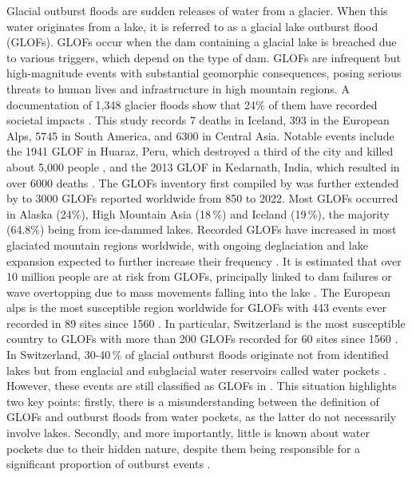 Glacial outburst floods are sudden releases of water from a glacier. When this water originates from a lake, it is referred to as a glacial lake outburst flood (GLOFs). GLOFs occur when the dam containing a glacial lake is breached due to various triggers, which depend on the type of dam. GLOFs are infrequent but high-magnitude events with substantial geomorphic consequences, posing serious threats to human lives and infrastructure in high mountain regions. A documentation of 1,348 glacier floods show that 24\% of them have recorded societal impacts \citep{Carrivick&Tweed2016}. This study records 7 deaths in Iceland, 393 in the European Alps, 5745 in South America, and 6300 in Central Asia. Notable events include the 1941 GLOF in Huaraz, Peru, which destroyed a third of the city and killed about 5,000 people \citep{Carey2005}, and the 2013 GLOF in Kedarnath, India, which resulted in over 6000 deaths \citep{Allen&al2016}. The GLOFs inventory first compiled by \cite{Carrivick&Tweed2016} was further extended by \cite{Emmer&al2022, Veh&al2022, Lutzow&al2023} to 3000 GLOFs reported worldwide from 850 to 2022. Most GLOFs occurred in Alaska (24\%), High Mountain Asia (18\,\%) and Iceland (19\,\%), the majority (64.8\%) being from ice-dammed lakes. Recorded GLOFs have increased in most glaciated mountain regions worldwide, with ongoing deglaciation and lake expansion expected to further increase their frequency \cite{Zhang&al2024}. It is estimated that over 10 million people are at risk from GLOFs, principally linked to dam failures or wave overtopping due to mass movements falling into the lake \citep{Zhang&al2024}. The European alps is the most susceptible region worldwide for GLOFs with 443 events ever recorded in 89 sites since 1560 \citep{Carrivick&Tweed2016,Lutzow&al2023}. In particular, Switzerland is the most susceptible country to GLOFs with more than 200 GLOFs recorded for 60 sites since 1560 \cite{Carrivick&Tweed2016}. %
In Switzerland, 30-40\,\% of glacial outburst floods originate not from identified lakes but from englacial and subglacial water reservoirs called water pockets \citep{Haeberli1983}. However, these events are still classified as GLOFs in \cite{Lutzow&al2023, Zhang&al2024}. This situation highlights two key points: firstly, there is a misunderstanding between the definition of GLOFs and outburst floods from water pockets, as the latter do not necessarily involve lakes. Secondly, and more importantly, little is known about water pockets due to their hidden nature, despite them being responsible for a significant proportion of outburst events \citep[e.g. 49\,\% in][]{Lutzow&al2023}.

